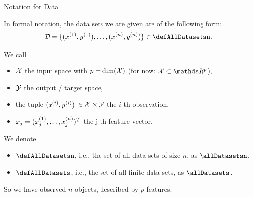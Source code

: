 \begin{vbframe}{Notation for Data}

In formal notation, the data sets we are given are of the following form:
\[
\D = \Dset \in \defAllDatasetsn.
\]

We call

\begin{itemize}

  \item $\mathcal{X}$  the input space with $p = \text{dim}(\mathcal{X})$ (for now: 
  $\Xspace \subset \R^p$),
  
  \item $\mathcal{Y}$ the output / target space,
  
  \item the tuple \((x^{(i)}, y^{(i)})\) $\in \mathcal{X}\times \mathcal{Y}$ the \(i\)-th observation,
  
  \item $x_j = (x^{(1)}_j, \ldots, x^{(n)}_j)^T$ the j-th feature vector.
  
\end{itemize}

We denote

\begin{itemize}

  \item  $\defAllDatasetsn$, i.e., the set of all data sets of size $n$, as $\allDatasetsn$,
  \item $\defAllDatasets$, i.e., the set of all finite data sets, as $\allDatasets$.
\end{itemize}

\lz

So we have observed $n$ objects, described by $p$ features.

\end{vbframe}


